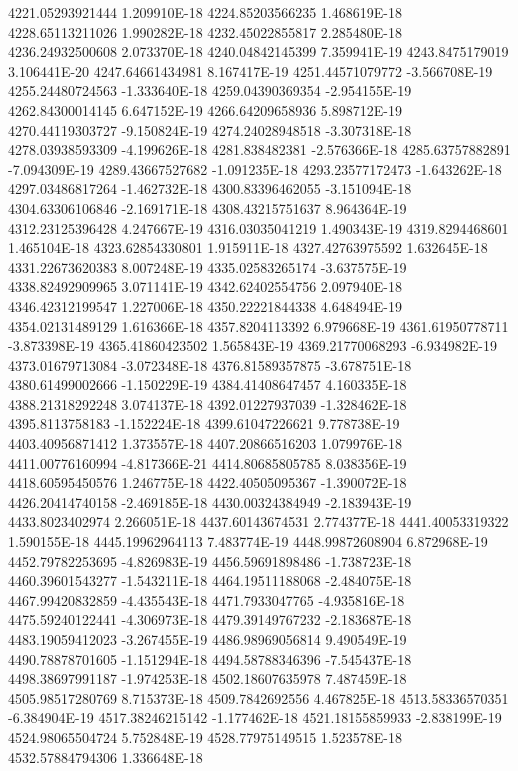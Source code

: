 4221.05293921444  1.209910E-18
4224.85203566235  1.468619E-18
4228.65113211026  1.990282E-18
4232.45022855817  2.285480E-18
4236.24932500608  2.073370E-18
4240.04842145399  7.359941E-19
4243.8475179019  3.106441E-20
4247.64661434981  8.167417E-19
4251.44571079772  -3.566708E-19
4255.24480724563  -1.333640E-18
4259.04390369354  -2.954155E-19
4262.84300014145  6.647152E-19
4266.64209658936  5.898712E-19
4270.44119303727  -9.150824E-19
4274.24028948518  -3.307318E-18
4278.03938593309  -4.199626E-18
4281.838482381  -2.576366E-18
4285.63757882891  -7.094309E-19
4289.43667527682  -1.091235E-18
4293.23577172473  -1.643262E-18
4297.03486817264  -1.462732E-18
4300.83396462055  -3.151094E-18
4304.63306106846  -2.169171E-18
4308.43215751637  8.964364E-19
4312.23125396428  4.247667E-19
4316.03035041219  1.490343E-19
4319.8294468601  1.465104E-18
4323.62854330801  1.915911E-18
4327.42763975592  1.632645E-18
4331.22673620383  8.007248E-19
4335.02583265174  -3.637575E-19
4338.82492909965  3.071141E-19
4342.62402554756  2.097940E-18
4346.42312199547  1.227006E-18
4350.22221844338  4.648494E-19
4354.02131489129  1.616366E-18
4357.8204113392  6.979668E-19
4361.61950778711  -3.873398E-19
4365.41860423502  1.565843E-19
4369.21770068293  -6.934982E-19
4373.01679713084  -3.072348E-18
4376.81589357875  -3.678751E-18
4380.61499002666  -1.150229E-19
4384.41408647457  4.160335E-18
4388.21318292248  3.074137E-18
4392.01227937039  -1.328462E-18
4395.8113758183  -1.152224E-18
4399.61047226621  9.778738E-19
4403.40956871412  1.373557E-18
4407.20866516203  1.079976E-18
4411.00776160994  -4.817366E-21
4414.80685805785  8.038356E-19
4418.60595450576  1.246775E-18
4422.40505095367  -1.390072E-18
4426.20414740158  -2.469185E-18
4430.00324384949  -2.183943E-19
4433.8023402974  2.266051E-18
4437.60143674531  2.774377E-18
4441.40053319322  1.590155E-18
4445.19962964113  7.483774E-19
4448.99872608904  6.872968E-19
4452.79782253695  -4.826983E-19
4456.59691898486  -1.738723E-18
4460.39601543277  -1.543211E-18
4464.19511188068  -2.484075E-18
4467.99420832859  -4.435543E-18
4471.7933047765  -4.935816E-18
4475.59240122441  -4.306973E-18
4479.39149767232  -2.183687E-18
4483.19059412023  -3.267455E-19
4486.98969056814  9.490549E-19
4490.78878701605  -1.151294E-18
4494.58788346396  -7.545437E-18
4498.38697991187  -1.974253E-18
4502.18607635978  7.487459E-18
4505.98517280769  8.715373E-18
4509.7842692556  4.467825E-18
4513.58336570351  -6.384904E-19
4517.38246215142  -1.177462E-18
4521.18155859933  -2.838199E-19
4524.98065504724  5.752848E-19
4528.77975149515  1.523578E-18
4532.57884794306  1.336648E-18

